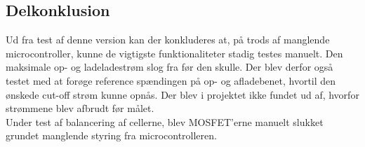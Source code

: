 \subsection{Delkonklusion}
Ud fra test af denne version kan der konkluderes at, på trods af manglende microcontroller, kunne de vigtigste funktionaliteter stadig testes manuelt. Den maksimale op- og ladeladestrøm slog fra før den skulle. Der blev derfor også testet med at forøge reference spændingen på op- og afladebenet, hvortil den ønskede cut-off strøm kunne opnås. Der blev i projektet ikke fundet ud af, hvorfor strømmene blev afbrudt før målet.
\\

Under test af balancering af cellerne, blev MOSFET'erne manuelt slukket grundet manglende styring fra microcontrolleren.





